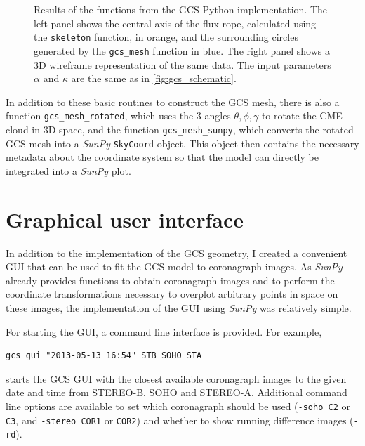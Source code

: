 \begin{figure}
	\centering
	
	\caption[Results of the functions from the \acs{GCS} Python implementation.]{Results of the functions from the \ac{GCS} Python implementation. The left panel shows the central axis of the flux rope, calculated using the \texttt{skeleton} function, in orange, and the surrounding circles generated by the \texttt{gcs\_mesh} function in blue. The right panel shows a 3D wireframe representation of the same data. The input parameters $\alpha$ and $\kappa$ are the same as in \autoref{fig:gcs_schematic}.}
	\label{fig:gcs_geometry}
\end{figure}

In addition to these basic routines to construct the \ac{GCS} mesh, there is also a function \verb|gcs_mesh_rotated|, which uses the 3 angles $\theta, \phi, \gamma$ to rotate the \ac{CME} cloud in 3D space, and the function \verb|gcs_mesh_sunpy|, which converts the rotated \ac{GCS} mesh into a \textit{SunPy} \texttt{SkyCoord} object. This object then contains the necessary metadata about the coordinate system so that the model can directly be integrated into a \textit{SunPy} plot.

\section{Graphical user interface}

In addition to the implementation of the \ac{GCS} geometry, I created a convenient \ac{GUI} that can be used to fit the \ac{GCS} model to coronagraph images. As \textit{SunPy} already provides functions to obtain coronagraph images and to perform the coordinate transformations necessary to overplot arbitrary points in space on these images, the implementation of the \ac{GUI} using \textit{SunPy} was relatively simple.

For starting the \ac{GUI}, a command line interface is provided. For example,
\begin{verbatim}
gcs_gui "2013-05-13 16:54" STB SOHO STA
\end{verbatim}
starts the \ac{GCS} \ac{GUI} with the closest available coronagraph images to the given date and time from \ac{STEREO}-B, \ac{SOHO} and \ac{STEREO}-A. Additional command line options are available to set which coronagraph should be used (\texttt{-soho C2} or \texttt{C3}, and \texttt{-stereo COR1} or \texttt{COR2}) and whether to show running difference images (\texttt{-rd}).


